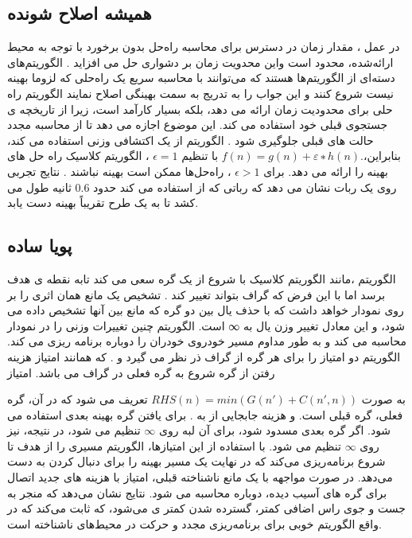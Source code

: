 \subsection{همیشه اصلاح شونده}
در  عمل ، مقدار زمان در دسترس برای محاسبه راه‌حل بدون برخورد با توجه به محیط ارائه‌شده، محدود است واین محدویت زمان بر دشواری  حل می افزاید . الگوریتم‌های  دسته‌ای از الگوریتم‌ها هستند که می‌توانند با محاسبه سریع یک راه‌حلی که لزوما بهینه نیست  شروع کنند و این جواب را به تدریج به سمت بهینگی اصلاح نمایند  الگوریتم  راه حلی برای محدودیت زمان  ارائه می دهد، بلکه بسیار کارآمد است، زیرا از تاریخچه ی جستجوی قبلی خود استفاده می کند. این موضوع  اجازه می دهد تا از محاسبه مجدد حالت های قبلی جلوگیری شود . الگوریتم از یک اکتشافی وزنی استفاده می کند، بنابراین،$ f(n) = g(n) + ε∗ h(n).$ با تنظیم 
$\epsilon=1$  
، الگوریتم کلاسیک  راه حل های بهینه را ارائه می دهد. برای
 $\epsilon>1$ 
، راه‌حل‌ها ممکن است بهینه نباشند . نتایج تجربی روی یک ربات نشان می دهد که رباتی که از 
استفاده می کند حدود 0.6 ثانیه طول می کشد تا به یک طرح تقریباً بهینه دست یابد. 



\subsection{پویا ساده}

الگوریتم
،مانند الگوریتم 
کلاسیک با شروع از یک گره سعی می کند تابه نقطه ی هدف برسد اما با این فرض که گراف بتواند تغییر کند . تشخیص یک مانع همان اثری را بر روی نمودار خواهد داشت که با حذف یال بین دو گره که مانع بین آنها تشخیص داده می شود، و این معادل تغییر وزن یال به ∞ است. الگوریتم
 چنین تغییرات وزنی را در نمودار محاسبه می کند و به طور مداوم مسیر خودروی خودران را دوباره برنامه ریزی می کند.
الگوریتم
  دو امتیاز را برای هر گره از گراف ذر نظر می گیرد  
    و  
   .  که همانند 
   امتیاز
     هزینه رفتن از گره شروع به گره فعلی در گراف می باشد. امتیاز
    
    به صورت
     $RHS(n) = min(G(n′) + C(n′, n)) $
    تعریف می شود که در آن،
     گره فعلی، 
    گره قبلی است.  و  
    هزینه جابجایی از 
    به
    . برای یافتن گره بهینه بعدی استفاده می شود. اگر گره بعدی مسدود شود،
    برای آن لبه روی 
    $\infty$ 
    تنظیم می شود، در نتیجه،
     نیز روی 
     $\infty$
     تنظیم می شود. با استفاده از این امتیازها، الگوریتم مسیری را از هدف تا شروع برنامه‌ریزی می‌کند که در نهایت یک مسیر بهینه را برای دنبال کردن به دست می‌دهد. در صورت مواجهه با یک مانع ناشناخته قبلی، امتیاز 
     با هزینه های جدید اتصال برای گره های آسیب دیده، دوباره محاسبه می شود. نتایج نشان می‌دهد که
     منجر به جست و جوی راس اضافی کمتر، گسترده شدن کمتر ی می‌شود، که ثابت می‌کند که
       در واقع الگوریتم خوبی برای برنامه‌ریزی مجدد و حرکت در محیط‌های ناشناخته است.




